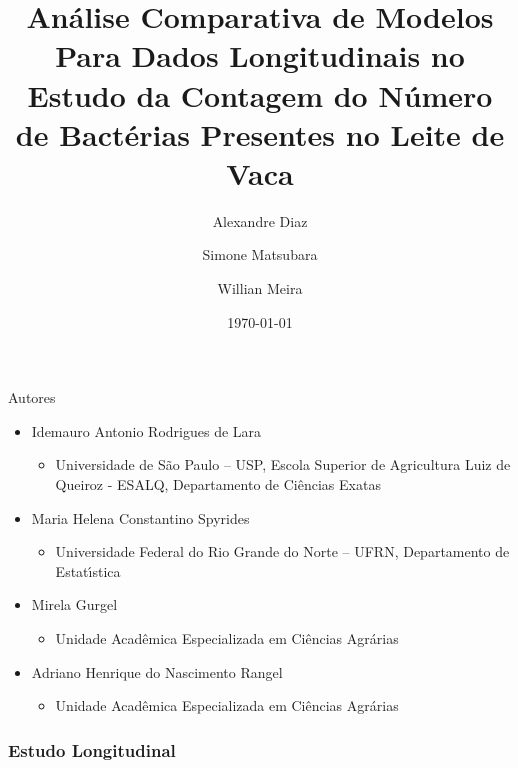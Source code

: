 \documentclass{beamer}
\title{Análise Comparativa de Modelos Para Dados Longitudinais no Estudo da Contagem do Número de Bactérias
       Presentes no Leite de Vaca}
\author{Alexandre Diaz \and Simone Matsubara \and Willian Meira}
\institute[UFPR] %
{
  Disciplina Análise de Dados Longitudinais \\
  Professor José Padilha\\
  Departmento de Estatística - UFPR
  }
\date{\today}
\begin{document}
\begin{frame}
\titlepage %
\end{frame}

\begin{frame}{Autores}
    \begin{itemize}
        \item Idemauro Antonio Rodrigues de Lara
          \begin{itemize}
            \item Universidade de São Paulo – USP, Escola Superior de Agricultura Luiz de Queiroz - ESALQ,                           Departamento de Ciências Exatas
          \end{itemize}
        \item Maria Helena Constantino Spyrides 
          \begin{itemize}
            \item Universidade Federal do Rio Grande do Norte – UFRN, Departamento de Estatı́stica
          \end{itemize}   
        \item Mirela Gurgel
          \begin{itemize}
            \item Unidade Acadêmica Especializada em Ciências Agrárias
          \end{itemize}
        \item Adriano Henrique do Nascimento Rangel
          \begin{itemize}
            \item Unidade Acadêmica Especializada em Ciências Agrárias
          \end{itemize} 
    \end{itemize} 
\end{frame}

\begin{frame}
  \frametitle{Estudo Longitudinal} %
  \tableofcontents %
\end{frame}
\end{document}
